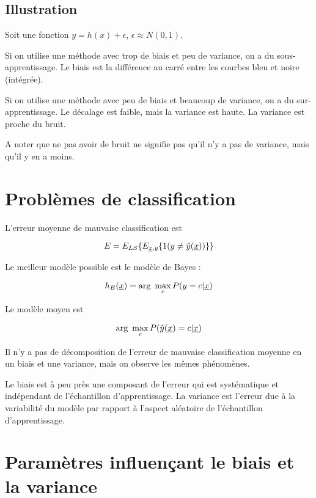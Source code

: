 		\subsection{Illustration}
		
		Soit une fonction $y = h(x) + \epsilon$, $\epsilon \approx N(0, 1)$.
		
		
		Si on utilise une méthode avec trop de biais et peu de variance, on a du sous-apprentissage. Le biais est la différence au carré entre les courbes bleu et noire (intégrée).
		
		
		Si on utilise une méthode avec peu de biais et beaucoup de variance, on a du sur-apprentissage. Le décalage est faible, mais la variance est haute. La variance est proche du bruit.
		
		
		A noter que ne pas avoir de bruit ne signifie pas qu'il n'y a pas de variance, mais qu'il y en a moins.
		
		
		
	\section{Problèmes de classification}
	
	L'erreur moyenne de mauvaise classification est
	
	$$E = E_{LS}\{E_{\underline{x}, y}\{1 (y \neq \hat{y}(\underline{x}))\}\}$$
	
	Le meilleur modèle possible est le modèle de Bayes :
	
	$$h_B(\underline{x}) = \text{arg } \max_c P(y = c \vert \underline{x})$$
	
	Le modèle moyen est
	
	$$\text{arg } \max_c P(\hat{y}(\underline{x}) = c \vert \underline{x})$$
	
	Il n'y a pas de décomposition de l'erreur de mauvaise classification moyenne en un biais et une variance, mais on observe les mêmes phénomènes.
	
	Le biais est à peu près une composant de l'erreur qui est systématique et indépendant de l'échantillon d'apprentissage. La variance est l'erreur due à la variabilité du modèle par rapport à l'aspect aléatoire de l'échantillon d'apprentissage.
	
	\section{Paramètres influençant le biais et la variance}
	
